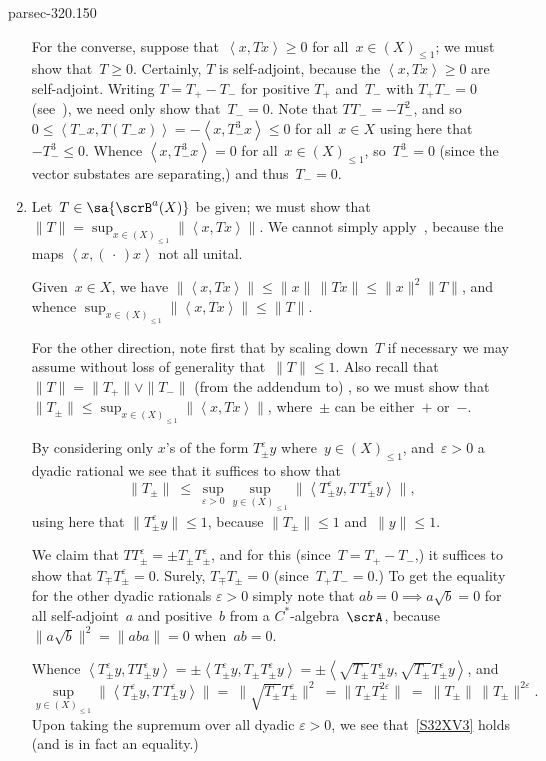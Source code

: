 \documentclass[b5page]{book}
\begin{document}
\begin{solution}{parsec-320.150}
\begin{enumerate}
For the converse,
suppose that~$\left<x,Tx\right>\geq 0$
for all~$x\in (X)_{\leq 1}$;
we must show that~$T\geq 0$.
Certainly, $T$ is self-adjoint,
because the $\left<x,Tx\right>\geq 0$ are self-adjoint.
Writing $T=T_+-T_-$
for positive $T_+$ and~$T_-$
with $T_+T_-=0$
(see~),
we need only show that~$T_-=0$.
Note that
 $TT_- = -T_-^2$,
and so
$0\leq\left<T_-x,T(T_-x)\right>
=-\left<x,T_-^3x\right>\leq 0$
for all~$x\in X$
using here that~$-T_-^3\leq 0$.
Whence $\left<x,T_-^3 x\right>=0$
for all~$x\in (X)_{\leq 1}$, 
so~$T_-^3=0$ (since the vector substates are separating,)
and thus~$T_-=0$.
\item
Let~$T\in\sa{\scrB^a(X)}$ be given;
we must show that $\|T\|=\sup_{x\in (X)_{\leq 1}} \|\left<x,Tx\right>\|$.
We cannot simply  apply~,
because the  maps  $\left<x,(\,\cdot\,)x\right>$ 
not all unital.

Given~$x\in X$,
we have
$\|\left<x,Tx\right>\|\leq \|x\|\,\|Tx\|
\leq \|x\|^2\|T\| $,
and
whence $\sup_{x\in (X)_{\leq 1} } \|\left<x,Tx\right>\| \leq \|T\|$.

For the other direction,
note first that by scaling down~$T$ if necessary
we may assume without loss of generality that~$\|T\|\leq 1$.
Also 
recall that~$\|T\|=\|T_+\|\vee \|T_-\|$
(from the addendum to)
,
so we must show that
$\|T_\pm\| \leq 
\sup_{x\in (X)_{\leq 1} } \|\left<x,Tx\right>\|$,
where~$\pm$ can be either~$+$ or~$-$.

By considering only $x$'s of the form
$T^\varepsilon_\pm y$ where~$y\in (X)_{\leq 1}$,
and~$\varepsilon>0$ a dyadic rational
we see that it suffices to show that
\begin{equation}
\label{S32XV3}
\textstyle \|T_\pm\| 
\ \leq\  \sup_{\varepsilon>0} \sup_{y\in (X)_{\leq 1}}
\|\left<T_\pm^\varepsilon y,T\,T_\pm^\varepsilon y\right>\|,
\end{equation}
using here that $\|T_\pm^\varepsilon y \|\leq 1$,
because $\|T_\pm\|\leq 1$ and~$\|y\|\leq 1$.

We claim that $T T_{\pm}^\varepsilon = \pm T_\pm T_{\pm}^\varepsilon$,
and for this
(since~$T=T_+-T_-$,)
it suffices to show that $T_\mp T_{\pm}^\varepsilon = 0$.
Surely, $T_\mp T_\pm = 0$ (since~$T_+T_-=0$.)
To get the equality for the other dyadic rationals $\varepsilon>0$
simply note that  $ab=0 \implies a\sqrt{b} = 0$
for all self-adjoint~$a$ and positive~$b$
from a $C^*$-algebra~$\scrA$,
because $\|a\sqrt{b}\|^2=\|aba\|=0$ when~$ab=0$.

Whence $
\left<T_\pm^\varepsilon y,
T T_\pm^\varepsilon y \right>
= \pm 
\left<T_\pm^\varepsilon y,
T_\pm T_\pm^\varepsilon y \right>
=
\pm
\left<\sqrt{T_\pm} T_\pm^\varepsilon y,
\sqrt{T_\pm} T_\pm^\varepsilon y \right>$,
and
$$
\sup_{y\in (X)_{\leq 1}}
\|\left<T_\pm^\varepsilon y,T\,T_\pm^\varepsilon y\right>\|
=\ 
\|\sqrt{T_\pm} T_\pm^\varepsilon\|^2
\ = \| T_\pm T_\pm^{2\varepsilon}\|
\ = \ \|T_\pm\|\, \|T_\pm\|^{2\varepsilon}.
$$
Upon taking the supremum over all dyadic $\varepsilon >0$,
we see that~\eqref{S32XV3}
holds (and is in fact an equality.)
\end{enumerate}
\end{solution}
\end{document}
